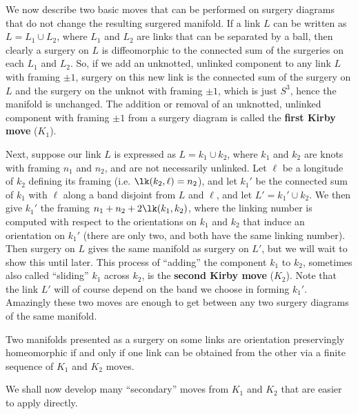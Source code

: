 We now describe two basic moves that can be performed on surgery diagrams that do not change the resulting surgered manifold. If a link $L$ can be written as $L = L_1 \cup L_2$, where $L_1$ and $L_2$ are links that can be separated by a ball, then clearly a surgery on $L$ is diffeomorphic to the connected sum of the surgeries on each $L_1$ and $L_2$. So, if we add an unknotted, unlinked component to any link $L$ with framing $\pm 1$, surgery on this new link is the connected sum of the surgery on $L$ and the surgery on the unknot with framing $\pm 1$, which is just $S^3$, hence the manifold is unchanged. The addition or removal of an unknotted, unlinked component with framing $\pm 1$ from a surgery diagram is called the \textbf{first Kirby move} ($K_1$). 

Next, suppose our link $L$ is expressed as $L = k_1 \cup k_2$, where $k_1$ and $k_2$ are knots with framing $n_1$ and $n_2$, and are not necessarily unlinked. Let $\ell$ be a longitude of $k_2$ defining its framing (i.e. $\lk(k_2,\ell)=n_2$), and let $k_1'$ be the connected sum of $k_1$ with $\ell$ along a band disjoint from $L$ and $\ell$, and let $L' = k_1' \cup k_2$. We then give $k_1'$ the framing $n_1+n_2+2\lk(k_1,k_2)$, where the linking number is computed with respect to the orientations on $k_1$ and $k_2$ that induce an orientation on $k_1'$ (there are only two, and both have the same linking number). Then surgery on $L$ gives the same manifold as surgery on $L'$, but we will wait to show this until later. This process of ``adding'' the component $k_1$ to $k_2$, sometimes also called ``sliding'' $k_1$ across $k_2$, is the \textbf{second Kirby move} ($K_2$). Note that the link $L'$ will of course depend on the band we choose in forming $k_1'$. Amazingly these two moves are enough to get between any two surgery diagrams of the same manifold.
\begin{thm}[Kirby]
Two manifolds presented as a surgery on some links are orientation preservingly homeomorphic if and only if one link can be obtained from the other via a finite sequence of $K_1$ and $K_2$ moves.
\end{thm}

We shall now develop many ``secondary'' moves from $K_1$ and $K_2$ that are easier to apply directly.

